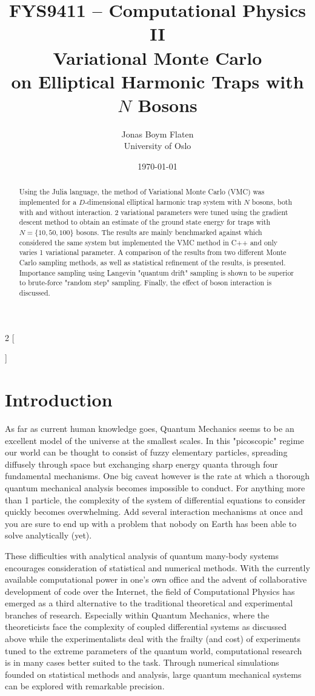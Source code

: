 \documentclass[a4paper,8pt]{article}
\title{\small FYS9411 -- Computational Physics II \\
\Huge Variational Monte Carlo\\\huge on Elliptical Harmonic Traps with $N$ Bosons}
\author{\large Jonas Boym Flaten \\
\small University of Oslo}
\date{\today}
\begin{document}
\begin{multicols}{2}
[
\maketitle
\begin{abstract}
Using the Julia language, the method of Variational Monte Carlo (VMC) was implemented for a $D$-dimensional elliptical harmonic trap system with $N$ bosons, both with and without interaction. 2 variational parameters were tuned using the gradient descent method to obtain an estimate of the ground state energy for traps with $N = \{10,50,100\}$ bosons. The results are mainly benchmarked against \cite{SWL} which considered the same system but implemented the VMC method in C++ and only varies 1 variational parameter. A comparison of the results from two different Monte Carlo sampling methods, as well as statistical refinement of the results, is presented. Importance sampling using Langevin "quantum drift" sampling is shown to be superior to brute-force "random step" sampling. Finally, the effect of boson interaction is discussed. 
\end{abstract}
]

\section{Introduction}
As far as current human knowledge goes, Quantum Mechanics seems to be an excellent model of the universe at the smallest scales. In this "picoscopic" regime our world can be thought to consist of fuzzy elementary particles, spreading diffusely through space but exchanging sharp energy quanta through four fundamental mechanisms. One big caveat however is the rate at which a thorough quantum mechanical analysis becomes impossible to conduct. For anything more than 1 particle, the complexity of the system of differential equations to consider quickly becomes overwhelming. Add several interaction mechanisms at once and you are sure to end up with a problem that nobody on Earth has been able to solve analytically (yet).

These difficulties with analytical analysis of quantum many-body systems encourages consideration of statistical and numerical methods. With the 
currently available computational power in one's own office and the advent of collaborative development of code over the Internet, the field of Computational Physics has emerged as a third alternative to the traditional theoretical and experimental branches of research. Especially within Quantum Mechanics, where the theoreticists face the complexity of coupled differential systems as discussed above while the experimentalists deal with the frailty (and cost) of experiments tuned to the extreme parameters of the quantum world, computational research is in many cases better suited to the task. Through numerical simulations founded on statistical methods and analysis, large quantum mechanical systems can be explored with remarkable precision.


\end{multicols}
\end{document}
